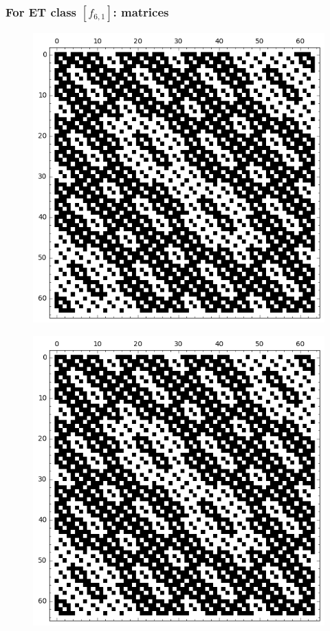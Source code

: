 \documentclass[pdf,sprung,slideColor,nocolorBG]{beamer}
\newenvironment{colortheme}[1]{
\def\ProvidesPackageRCS $##1${\relax}
\renewcommand{\ProcessOptions}{\relax}
\makeatletter

\makeatother
}{}
\begin{document}
\begin{colortheme}{jubata}
\begin{frame}
\frametitle{For ET class $[f_{6,1}]$: matrices}
\begin{figure}
\centering
\begin{minipage}{.48\textwidth}
  \centering
  \includegraphics[width=.9\linewidth]{../matrix_plot/re6_1_weight_class_matrix.png}
  \label{fig:6_1_weight_class_matrix}
\end{minipage}%
\begin{minipage}{.48\textwidth}
  \centering
  \includegraphics[width=.9\linewidth]{../matrix_plot/re6_1_bent_cayley_graph_index_matrix.png}

\end{minipage}
\end{figure}
\end{frame}
\end{colortheme}
\end{document}
